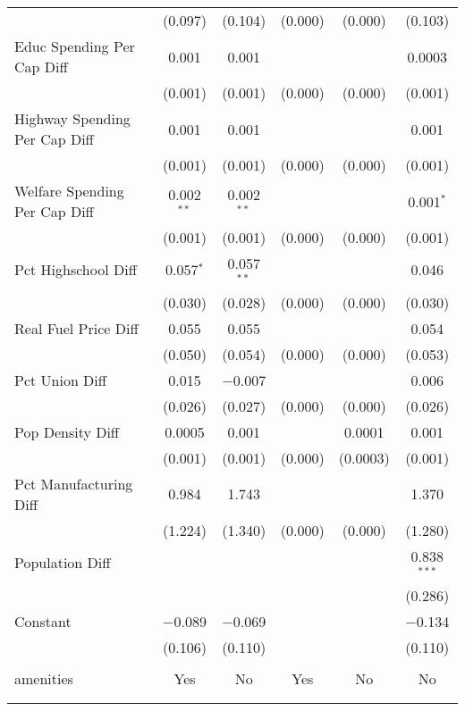 \begin{table}[!htbp]
\begin{tabular}{@{\extracolsep{5pt}}lccccc}
  & (0.097) & (0.104) & (0.000) & (0.000) & (0.103) \\ 
  Educ Spending Per Cap Diff & 0.001 & 0.001 &  &  & 0.0003 \\ 
  & (0.001) & (0.001) & (0.000) & (0.000) & (0.001) \\ 
  Highway Spending Per Cap Diff & 0.001 & 0.001 &  &  & 0.001 \\ 
  & (0.001) & (0.001) & (0.000) & (0.000) & (0.001) \\ 
  Welfare Spending Per Cap Diff & 0.002$^{**}$ & 0.002$^{**}$ &  &  & 0.001$^{*}$ \\ 
  & (0.001) & (0.001) & (0.000) & (0.000) & (0.001) \\ 
  Pct Highschool Diff & 0.057$^{*}$ & 0.057$^{**}$ &  &  & 0.046 \\ 
  & (0.030) & (0.028) & (0.000) & (0.000) & (0.030) \\ 
  Real Fuel Price Diff & 0.055 & 0.055 &  &  & 0.054 \\ 
  & (0.050) & (0.054) & (0.000) & (0.000) & (0.053) \\ 
  Pct Union Diff & 0.015 & $-$0.007 &  &  & 0.006 \\ 
  & (0.026) & (0.027) & (0.000) & (0.000) & (0.026) \\ 
  Pop Density Diff & 0.0005 & 0.001 &  & 0.0001 & 0.001 \\ 
  & (0.001) & (0.001) & (0.000) & (0.0003) & (0.001) \\ 
  Pct Manufacturing Diff & 0.984 & 1.743 &  &  & 1.370 \\ 
  & (1.224) & (1.340) & (0.000) & (0.000) & (1.280) \\ 
  Population Diff &  &  &  &  & 0.838$^{***}$ \\ 
  &  &  &  &  & (0.286) \\ 
  Constant & $-$0.089 & $-$0.069 &  &  & $-$0.134 \\ 
  & (0.106) & (0.110) &  &  & (0.110) \\ 
 \hline \\[-1.8ex] 
amenities & Yes & No & Yes & No & No \\ 
\hline \\[-1.8ex] 
\hline 
\hline \\[-1.8ex] 
\end{tabular} 
\end{table} 
